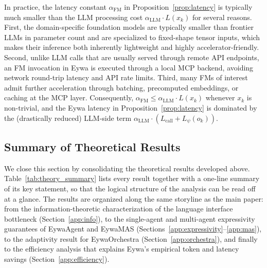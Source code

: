 In practice, the latency constant $\alpha_{\mathrm{FM}}$ in Proposition~\ref{prop:latency} is typically much smaller than the LLM processing cost $\alpha_{\mathrm{LLM}}\cdot L(x_k)$ for several reasons. First, the domain-specific foundation models are typically smaller than frontier LLMs in parameter count and are specialized to fixed-shape tensor inputs, which makes their inference both inherently lightweight and highly accelerator-friendly. Second, unlike LLM calls that are usually served through remote API endpoints, an FM invocation in Eywa is executed through a local MCP backend, avoiding network round-trip latency and API rate limits. Third, many FMs of interest admit further acceleration through batching, precomputed embeddings, or caching at the MCP layer. Consequently, $\alpha_{\mathrm{FM}}\le\alpha_{\mathrm{LLM}}\cdot L(x_k)$ whenever $x_k$ is non-trivial, and the Eywa latency in Proposition~\ref{prop:latency} is dominated by the (drastically reduced) LLM-side term $\alpha_{\mathrm{LLM}}\cdot(L_{\mathrm{call}}+L_{\psi}(o_k))$.



\subsection{Summary of Theoretical Results}
\label{app:summary}

We close this section by consolidating the theoretical results developed above. Table~\ref{tab:theory_summary} lists every result together with a one-line summary of its key statement, so that the logical structure of the analysis can be read off at a glance. The results are organized along the same storyline as the main paper: from the information-theoretic characterization of the language interface bottleneck (Section~\ref{app:info}), to the single-agent and multi-agent expressivity guarantees of EywaAgent and EywaMAS (Sections~\ref{app:expressivity}--\ref{app:mas}), to the adaptivity result for EywaOrchestra (Section~\ref{app:orchestra}), and finally to the efficiency analysis that explains Eywa's empirical token and latency savings (Section~\ref{app:efficiency}).


